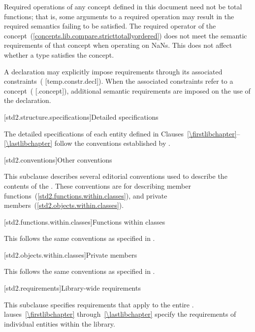 \pnum
Required operations of any concept defined in this document need not be
total functions; that is, some arguments to a required operation may
result in the required semantics failing to be satisfied. \enterexample
The required \tcode{<} operator of the 
concept~(\ref{concepts.lib.compare.stricttotallyordered}) does not meet the
semantic requirements of that concept when operating on NaNs.\exitexample
This does not affect whether a type satisfies the concept.

\pnum
A declaration may explicitly impose requirements through its associated
constraints~( [temp.\brk{}constr.\brk{}decl]). When the associated constraints
refer to a concept~( [.concept]), additional semantic requirements are
imposed on the use of the declaration.

[std2.structure.specifications]{Detailed specifications}

\pnum
The detailed specifications of each entity defined in
Clauses~\ref{\firstlibchapter}--\ref{\lastlibchapter} follow the conventions
established by .

[std2.conventions]{Other conventions}
%

\pnum
This subclause describes several editorial conventions used to describe the contents
of the . These conventions are for describing
member functions~(\ref{std2.functions.within.classes}),
and private members~(\ref{std2.objects.within.classes}).

[std2.functions.within.classes]{Functions within classes}

\pnum
This  follows the same conventions as specified in .

[std2.objects.within.classes]{Private members}

\pnum
This  follows the same conventions as specified in .

[std2.requirements]{Library-wide requirements}

\pnum
This subclause specifies requirements that apply to the entire .
lauses~\ref{\firstlibchapter} through~\ref{\lastlibchapter}
specify the requirements of individual entities within the library.

